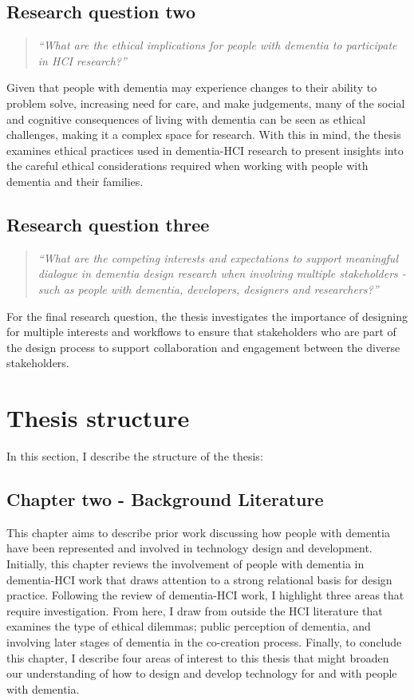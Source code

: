 \subsection{Research question two}
\label{RQ2}
\begin{quote}
\textit{``What are the ethical implications for people with dementia to participate in HCI research?''}
\end{quote}
Given that people with dementia may experience changes to their ability to problem solve, increasing need for care, and make judgements, many of the social and cognitive consequences of living with dementia can be seen as ethical challenges, making it a complex space for research. With this in mind, the thesis examines ethical practices used in dementia-HCI research to present insights into the careful ethical considerations required when working with people with dementia and their families. 

\subsection{Research question three}
\label{RQ3}
\begin{quote}
\textit{``What are the competing interests and expectations to support meaningful dialogue in dementia design research when involving multiple stakeholders - such as people with dementia, developers, designers and researchers?''}
\end{quote}
For the final research question, the thesis investigates the importance of designing for multiple interests and workflows to ensure that stakeholders who are part of the design process to support collaboration and engagement between the diverse stakeholders. 

\section{Thesis structure}
\label{Intro: Thesis structure}
In this section, I describe the structure of the thesis:

\subsection{Chapter two - Background Literature}
\label{Intro:ChapterTwo}
This chapter aims to describe prior work discussing how people with dementia have been represented and involved in technology design and development. Initially, this chapter reviews the involvement of people with dementia in dementia-HCI work that draws attention to a strong relational basis for design practice. Following the review of dementia-HCI work, I highlight three areas that require investigation. From here, I draw from outside the HCI literature that examines the type of ethical dilemmas; public perception of dementia, and involving later stages of dementia in the co-creation process. Finally, to conclude this chapter, I describe four areas of interest to this thesis that might broaden our understanding of how to design and develop technology for and with people with dementia.

